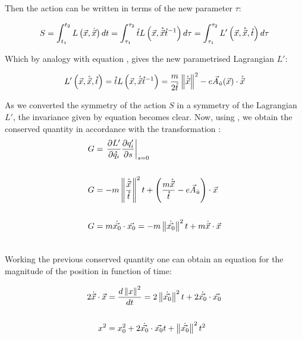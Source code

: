 Then the action can be written in terms of the new parameter $\tau$:

\begin{equation*}
S = \int_{t_1}^{t_2}L\left( \vec{x},\dot{\vec{x}} \right)dt = \int_{\tau_1}^{\tau_2}\mathring{t}L\left( \vec{x},\mathring{\vec{x}}{\mathring{t}}^{-1} \right)d\tau                                                                    = \int_{\tau_1}^{\tau_2}L'\left( \vec{x},\mathring{\vec{x}},\mathring{t} \right)d\tau
\label{eq:action}
\end{equation*}

Which by analogy with equation , gives the new parametrised Lagrangian $L'$:

\begin{equation*}
L'\left( \vec{x},\mathring{\vec{x}},\mathring{t} \right) = \mathring{t}L\left( \vec{x},\mathring{\vec{x}}{\mathring{t}}^{-1} \right) = \frac{m}{2\mathring{t}}\left\lVert \mathring{\vec{x}} \right\rVert^2 - e\vec{A}_{\hat{u}}(\vec{x})\cdot\mathring{\vec{x}}
\end{equation*}

As we converted the symmetry of the action $S$ in a symmetry of the Lagrangian $L'$, the invariance given by  equation  becomes clear. Now, using \cite[Thm (dontforget)]{scheck}, we obtain the conserved quantity in accordance with the transformation : \\

\begin{align*}
\nonumber
G &= \left. \frac{\partial L'}{\partial \mathring{q_i}} \frac{\partial q'_i}{\partial s} \right|_{s=0}\\ \nonumber
\\ \nonumber
G &= -m\left\lVert \frac{\mathring{\vec{x}}}{\mathring{t}} \right\rVert^2t + \left( \frac{m\mathring{\vec{x}}}{\mathring{t}} - e\vec{A}_{\hat{u}} \right)\cdot \vec{x}\\ \nonumber
\\ \nonumber
G &= m\dot{\vec{x_0}}\cdot\vec{x_0} = -m\left\lVert \dot{\vec{x_0}} \right\rVert^2t + m\dot{\vec{x}}\cdot\vec{x} \\\nonumber
\end{align*}

Working the previous conserved quantity one can obtain an equation for the magnitude of the position in function of time:

\begin{align}
\nonumber
 2\dot{\vec{x}}\cdot\vec{x} &= \frac{d\left\lVert x \right\rVert^2}{dt} = 2\left\lVert \dot{\vec{x_0}} \right\rVert^2t + 2\dot{\vec{x_0}}\cdot\vec{x_0}\\ \nonumber
 \\ 
 x^2 &= x_0^2 +2\dot{\vec{x_0}}\cdot\vec{x_0}t +\left\lVert \dot{\vec{x_0}} \right\rVert^2t^2  
 \label{eq:radius}
\end{align}

